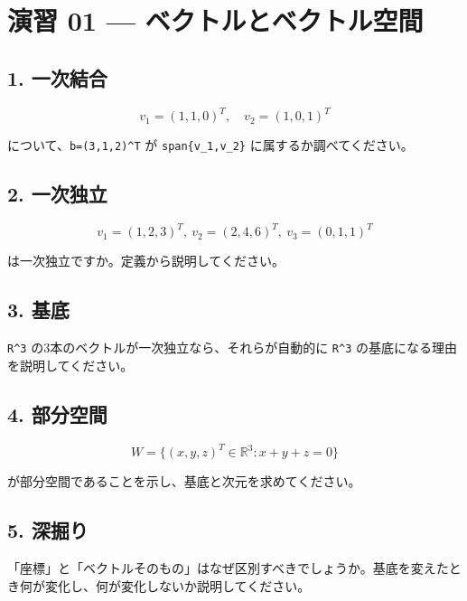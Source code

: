 \documentclass[
  11pt,
  a4paper,
]{ltjsarticle}
\author{}
\date{}
\begin{document}
\hypertarget{ux6f14ux7fd2-01-ux30d9ux30afux30c8ux30ebux3068ux30d9ux30afux30c8ux30ebux7a7aux9593}{%
\section{演習 01 ---
ベクトルとベクトル空間}\label{ux6f14ux7fd2-01-ux30d9ux30afux30c8ux30ebux3068ux30d9ux30afux30c8ux30ebux7a7aux9593}}

\hypertarget{ux4e00ux6b21ux7d50ux5408}{%
\subsection{1. 一次結合}\label{ux4e00ux6b21ux7d50ux5408}}

\[
v_1=(1,1,0)^T,\quad v_2=(1,0,1)^T
\]

について、\texttt{b=(3,1,2)\^{}T} が \texttt{span\{v\_1,v\_2\}}
に属するか調べてください。

\hypertarget{ux4e00ux6b21ux72ecux7acb}{%
\subsection{2. 一次独立}\label{ux4e00ux6b21ux72ecux7acb}}

\[
v_1=(1,2,3)^T,\ v_2=(2,4,6)^T,\ v_3=(0,1,1)^T
\]

は一次独立ですか。定義から説明してください。

\hypertarget{ux57faux5e95}{%
\subsection{3. 基底}\label{ux57faux5e95}}

\texttt{R\^{}3} の3本のベクトルが一次独立なら、それらが自動的に
\texttt{R\^{}3} の基底になる理由を説明してください。

\hypertarget{ux90e8ux5206ux7a7aux9593}{%
\subsection{4. 部分空間}\label{ux90e8ux5206ux7a7aux9593}}

\[
W=\{(x,y,z)^T\in\mathbb R^3:x+y+z=0\}
\]

が部分空間であることを示し、基底と次元を求めてください。

\hypertarget{ux6df1ux6398ux308a}{%
\subsection{5. 深掘り}\label{ux6df1ux6398ux308a}}

「座標」と「ベクトルそのもの」はなぜ区別すべきでしょうか。基底を変えたとき何が変化し、何が変化しないか説明してください。
\end{document}
